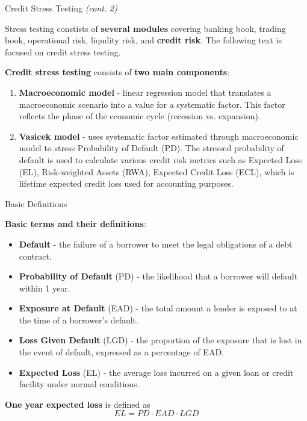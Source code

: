 \documentclass{beamer}
\begin{document}
\begin{frame}{Credit Stress Testing \textit{(cont. 2)}}
\justifying
\small

Stress testing constists of \textbf{several modules} covering banking book, trading book, operational risk, liqudity risk, and \textbf{credit risk}. The following text is focused on credit stress testing.

\medskip

\textbf{Credit stress testing} consists of \textbf{two main components}:
\begin{enumerate}
\item \textbf{Macroeconomic model} - linear regression model that translates a macroeconomic scenario into a value for a systematic factor. This factor reflects the phase of the economic cycle (recession vs. expansion).
\item \textbf{Vasicek model} - uses systematic factor estimated through macroeconomic model to stress Probability of Default (PD). The stressed probability of default is used to calculate various credit risk metrics such as Expected Loss (EL), Risk-weighted Assets (RWA), Expected Credit Loss (ECL), which is lifetime expected credit loss used for accounting purposes.
\end{enumerate}

\end{frame}

\begin{frame}{Basic Definitions}
\justifying
\small

\textbf{Basic terms and their definitions}:
\begin{itemize}
\item \textbf{Default} - the failure of a borrower to meet the legal obligations of a debt contract.
\item \textbf{Probability of Default} (PD) - the likelihood that a borrower will default within 1 year.
\item \textbf{Exposure at Default} (EAD) - the total amount a lender is exposed to at the time of a borrower's default.
\item \textbf{Loss Given Default} (LGD) - the proportion of the exposure that is lost in the event of default, expressed as a percentage of EAD.
\item \textbf{Expected Loss} (EL) - the average loss incurred on a given loan or credit facility under normal conditions.
\end{itemize}

\medskip

\textbf{One year expected loss} is defined as
\begin{equation}
EL = PD \cdot EAD \cdot LGD
\end{equation}

\end{frame}
\end{document}
